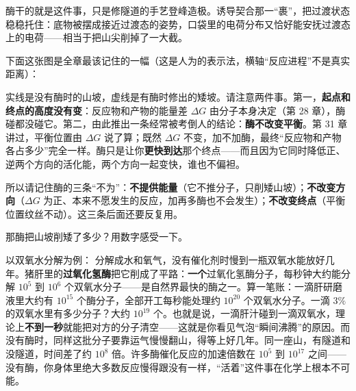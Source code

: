 酶干的就是这件事，只是修隧道的手艺登峰造极。诱导契合那一“裹”，把过渡状态稳稳托住：底物被摆成接近过渡态的姿势，口袋里的电荷分布又恰好能安抚过渡态上的电荷——相当于把山尖削掉了一大截。

下面这张图是全章最该记住的一幅（这是人为的表示法，横轴“反应进程”不是真实距离）：

\begin{center}
\end{center}

实线是没有酶时的山坡，虚线是有酶时修出的矮坡。请注意两件事。第一，\textbf{起点和终点的高度没有变}：反应物和产物的能量差 $\Delta G$ 由分子本身决定（第 28 章），酶碰都没碰它。第二，由此推出一条经常被考倒人的结论：\textbf{酶不改变平衡}。第 31 章讲过，平衡位置由 $\Delta G$ 说了算；既然 $\Delta G$ 不变，加不加酶，最终“反应物和产物各占多少”完全一样。酶只是让你\textbf{更快到达}那个终点——而且因为它同时降低正、逆两个方向的活化能，两个方向一起变快，谁也不偏袒。

所以请记住酶的三条“不为”：\textbf{不提供能量}（它不推分子，只削矮山坡）；\textbf{不改变方向}（$\Delta G$ 为正、本来不愿发生的反应，加再多酶也不会发生）；\textbf{不改变终点}（平衡位置纹丝不动）。这三条后面还要反复用。

那酶把山坡削矮了多少？用数字感受一下。

\begin{qiaoliang}
以双氧水分解为例： 分解成水和氧气，没有催化剂时慢到一瓶双氧水能放好几年。猪肝里的\textbf{过氧化氢酶}把它削成了平路：\textbf{一个}过氧化氢酶分子，每秒钟大约能分解 $10^{5}$ 到 $10^{6}$ 个双氧水分子——是自然界最快的酶之一。算一笔账：一滴肝研磨液里大约有 $10^{15}$ 个酶分子，全部开工每秒能处理约 $10^{20}$ 个双氧水分子。一滴 $3\%$ 的双氧水里有多少分子？大约 $10^{19}$ 个。也就是说，一滴肝汁碰到一滴双氧水，理论上\textbf{不到一秒}就能把对方的分子清空——这就是你看见气泡“瞬间沸腾”的原因。而没有酶时，同样这批分子要靠运气慢慢翻山，得等上好几年。同一座山，有隧道和没隧道，时间差了约 $10^{8}$ 倍。许多酶催化反应的加速倍数在 $10^{5}$ 到 $10^{17}$ 之间——没有酶，你身体里绝大多数反应慢得跟没有一样，“活着”这件事在化学上根本不可能。
\end{qiaoliang}

